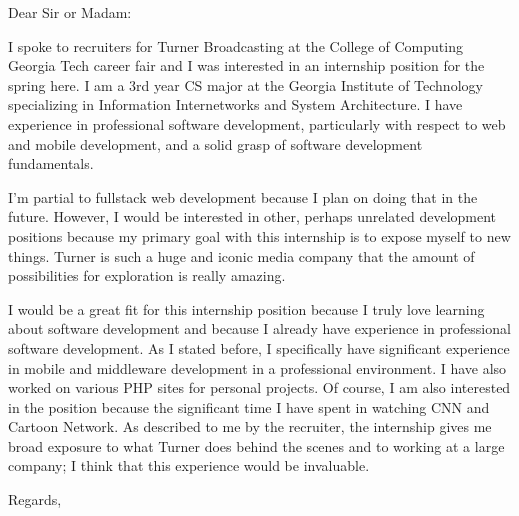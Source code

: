 \documentclass{letter}
\begin{document}
\begin{letter}{}
\opening{Dear Sir or Madam:}

I spoke to recruiters for Turner Broadcasting at the College of Computing Georgia Tech career fair and I was interested in an internship position for the spring here. I am a 3rd year CS major at the Georgia Institute of Technology specializing in Information Internetworks and System Architecture. I have experience in professional software development, particularly with respect to web and mobile development, and a solid grasp of software development fundamentals. 

I'm partial to fullstack web development because I plan on doing that in the future. However, I would be interested in other, perhaps unrelated development positions because my primary goal with this internship is to expose myself to new things. Turner is such a huge and iconic media company that the amount of possibilities for exploration is really amazing.

I would be a great fit for this internship position because I truly love learning about software development and because I already have experience in professional software development.  As I stated before, I specifically have significant experience in mobile and middleware development in a professional environment. I have also worked on various PHP sites for personal projects. Of course, I am also interested in the position because the significant time I have spent in watching CNN and Cartoon Network. As described to me by the recruiter, the internship gives me broad exposure to what Turner does behind the scenes and to working at a large company; I think that this experience would be invaluable.


\closing{Regards,}
\end{letter}
\end{document}
